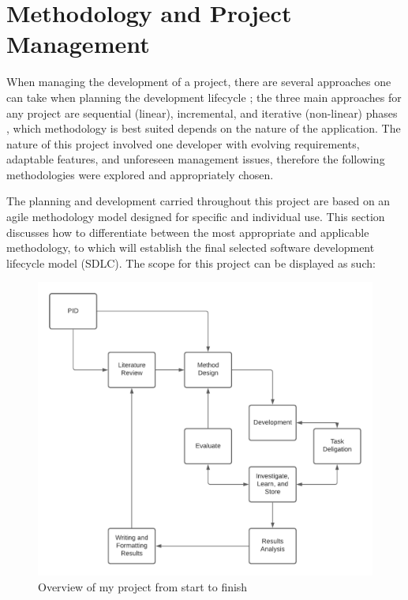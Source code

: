 \chapter{Methodology and Project Management}

When managing the development of a project, there are several approaches one can take when planning the development lifecycle \parencite{shylesh2017study}; the three main approaches for any project are sequential (linear), incremental, and iterative (non-linear) phases \parencite{akinsola2020comparative}, which methodology is best suited depends on the nature of the application. The nature of this project involved one developer with evolving requirements, adaptable features, and unforeseen management issues, therefore the following methodologies were explored and appropriately chosen.

The planning and development carried throughout this project are based on an agile methodology model designed for specific and individual use. This section discusses how to differentiate between the most appropriate and applicable methodology, to which will establish the final selected software development lifecycle model (SDLC). The scope for this project can be displayed as such:

\begin{figure}[H]
    \centering
    \includegraphics[width=\textwidth]{figures/chapter-3/ProjectOverviewFlowChart.pdf}
    \caption[Overview of Project Workflow]{Overview of my project from start to finish
    \label{fig:ProjectWorkflow}}
\end{figure}

